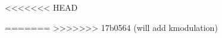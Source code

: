 \documentclass[
12pt, %
english, %
singlespacing, %
liststotoc, %
headsepline, %
]{MastersDoctoralThesis} %
\author{Felix \textsc{Soubelet}} %
\begin{document}
\frontmatter %

\pagestyle{plain} %






% 
% 
% 
% 
% 

\setcounter{tocdepth}{1}  %
\tableofcontents %
\listoffigures %
\listoftables %

% 
% 
% 



\mainmatter %

\pagestyle{thesis} %


% 
% 
% 
% 

% 
% 
% 
% 



\printbibliography
{}


\appendix %

<<<<<<< HEAD

=======
% 
>>>>>>> 17b0564 (will add kmodulation)

% 
% 
% 

\end{document}
